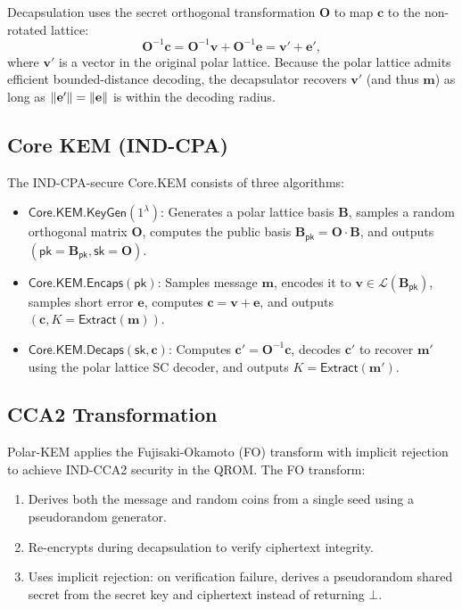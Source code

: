 \documentclass[11pt,a4paper]{article}
\newcommand{\polarKem}{\textsf{Polar-KEM}\xspace}
\newcommand{\CoreKEM}{\textsf{Core.KEM}\xspace}
\newcommand{\FO}{\textsf{FO}\xspace}
\newcommand{\Extract}{\textsf{Extract}\xspace}
\newcommand{\INDCPA}{\textsf{IND-CPA}\xspace}
\newcommand{\INDCCA}{\textsf{IND-CCA2}\xspace}
\newcommand{\QROM}{\textsf{QROM}\xspace}
\newcommand{\pk}{\mathsf{pk}}
\newcommand{\sk}{\mathsf{sk}}
\DeclarePairedDelimiter{\norm}{\lVert}{\rVert}
\begin{document}
Decapsulation uses the secret orthogonal transformation $\mathbf{O}$ to map $\mathbf{c}$ to the non-rotated lattice:
\[
\mathbf{O}^{-1} \mathbf{c} = \mathbf{O}^{-1} \mathbf{v} + \mathbf{O}^{-1} \mathbf{e} = \mathbf{v}' + \mathbf{e}',
\]
where $\mathbf{v}'$ is a vector in the original polar lattice. Because the polar lattice admits efficient bounded-distance decoding, the decapsulator recovers $\mathbf{v}'$ (and thus $\mathbf{m}$) as long as $\norm{\mathbf{e}'} = \norm{\mathbf{e}}$ is within the decoding radius.

\subsection{Core KEM (IND-CPA)}\label{sec:core-kem}

The \INDCPA-secure \CoreKEM consists of three algorithms:

\begin{itemize}[leftmargin=2em]
\item $\CoreKEM.\mathsf{KeyGen}(1^\lambda)$: Generates a polar lattice basis $\mathbf{B}$, samples a random orthogonal matrix $\mathbf{O}$, computes the public basis $\mathbf{B}_{\pk} = \mathbf{O} \cdot \mathbf{B}$, and outputs $(\pk = \mathbf{B}_{\pk}, \sk = \mathbf{O})$.
\item $\CoreKEM.\mathsf{Encaps}(\pk)$: Samples message $\mathbf{m}$, encodes it to $\mathbf{v} \in \mathcal{L}(\mathbf{B}_{\pk})$, samples short error $\mathbf{e}$, computes $\mathbf{c} = \mathbf{v} + \mathbf{e}$, and outputs $(\mathbf{c}, K = \Extract(\mathbf{m}))$.
\item $\CoreKEM.\mathsf{Decaps}(\sk, \mathbf{c})$: Computes $\mathbf{c}' = \mathbf{O}^{-1} \mathbf{c}$, decodes $\mathbf{c}'$ to recover $\mathbf{m}'$ using the polar lattice SC decoder, and outputs $K = \Extract(\mathbf{m}')$.
\end{itemize}

\subsection{CCA2 Transformation}\label{sec:cca-transform}

\polarKem applies the Fujisaki-Okamoto (\FO) transform with implicit rejection to achieve \INDCCA security in the \QROM. The \FO transform:

\begin{enumerate}[leftmargin=2em]
\item Derives both the message and random coins from a single seed using a pseudorandom generator.
\item Re-encrypts during decapsulation to verify ciphertext integrity.
\item Uses implicit rejection: on verification failure, derives a pseudorandom shared secret from the secret key and ciphertext instead of returning $\bot$.
\end{enumerate}
\end{document}
